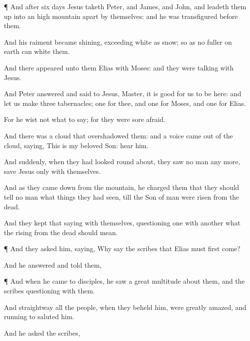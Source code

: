 {\par }{\PP {}¶
And
after
six
days
Jesus
taketh
{}
Peter,
and
James,
and
John,
and
leadeth
them
up
into
an
high
mountain
apart
by
themselves:
and he was
transfigured
before
them.

And
his
raiment
became
shining,
exceeding
white
as
snow; so
as
no
fuller
on
earth
can white
them.

And there
appeared unto
them
Elias
with
Moses:
and they
were
talking with
Jesus.

And
Peter
answered and
said to
Jesus,
Master, it
is
good for
us to
be
here:
and let us
make
three
tabernacles;
one for
thee,
and
one for
Moses,
and
one for
Elias.

For he
wist
not
what to
say;
for they
were sore
afraid.

And there
was a
cloud that
overshadowed
them:
and a
voice
came out
of the
cloud,
saying,
This
is
my
beloved
Son:
hear
him.

And
suddenly, when they had looked round
about, they
saw no
man any
more,
save
Jesus
only
with
themselves.

And
as they came
down
from the
mountain, he
charged
them
that they should
tell no
man what
things they had
seen,
till the
Son of
man were
risen
from the
dead.

And they
kept that
saying
with
themselves, questioning one with
another
what the
rising
from the
dead should
mean.


\par }{\PP {}¶
And they
asked
him,
saying,
Why
say the
scribes
that
Elias
must
first
come?

And he
answered and
told
them,
{}



\par }{\PP {}¶
And when he
came
to
{}
disciples, he
saw
a
great
multitude
about
them,
and the
scribes
questioning with
them.

And
straightway
all the
people, when they
beheld
him, were greatly
amazed,
and running
to
{}
saluted
him.

And he
asked the
scribes,
{}

}
